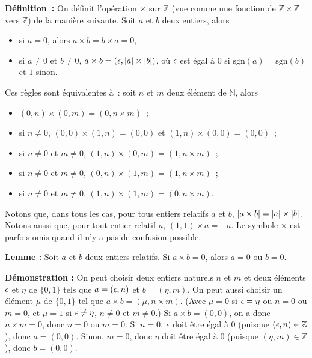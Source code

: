 \noindent\textbf{Définition :} 
    On définit l'opération $\times$ sur $\mathbb{Z}$ (vue comme une fonction de $\mathbb{Z} \times \mathbb{Z}$ vers $\mathbb{Z}$) de la manière suivante.
    Soit $a$ et $b$ deux entiers, alors
    \begin{itemize}[nosep]
        \item si $a = 0$, alors $a \times b = b \times a = 0$,
        \item si $a \neq 0$ et $b \neq 0$, $a \times b = (\epsilon, \left\lvert a \right\rvert \times \left\lvert b \right\rvert)$, où $\epsilon$ est égal à $0$ si $\mathrm{sgn}(a) = \mathrm{sgn}(b)$ et $1$ sinon.
    \end{itemize}
    Ces règles sont équivalentes à : soit $n$ et $m$ deux élément de $\mathbb{N}$, alors 
    \begin{itemize}[nosep]
        \item $(0,n) \times (0,m) = (0, n \times m)$ ;
        \item si $n \neq 0$, $(0,0) \times (1,n) = (0, 0)$ et $(1, n) \times (0, 0) = (0,0)$ ;
        \item si $n \neq 0$ et $m \neq 0$, $(1,n) \times (0,m) = (1, n \times m)$ ;
        \item si $n \neq 0$ et $m \neq 0$, $(0,n) \times (1,m) = (1, n \times m)$ ;
        \item si $n \neq 0$ et $m \neq 0$, $(1,n) \times (1,m) = (0, n \times m)$. 
    \end{itemize}
    Notons que, dans tous les cas, pour tous entiers relatifs $a$ et $b$, $\left\lvert a \times b \right\rvert = \left\lvert a \right\rvert \times \left\lvert b \right\rvert$.
    Notons aussi que, pour tout entier relatif $a$, $(1,1) \times a = -a$.
    Le symbole $\times$ est parfois omis quand il n'y a pas de confusion possible.
    \sindex[isy]{$\times$}

\medskip

\noindent\textbf{Lemme :} Soit $a$ et $b$ deux entiers relatifs.
    Si $a \times b = 0$, alors $a = 0$ ou $b = 0$.

\medskip

\noindent\textbf{Démonstration :}  
    On peut choisir deux entiers naturels $n$ et $m$ et deux éléments $\epsilon$ et $\eta$ de $\lbrace 0, 1 \rbrace$ tels que $a = (\epsilon, n)$ et $b = (\eta, m)$. 
    On peut aussi choisir un élément $\mu$ de $\lbrace 0, 1 \rbrace$ tel que $a \times b = (\mu, n \times m)$.
    (Avec $\mu = 0$ si $\epsilon = \eta$ ou $n = 0$ ou $m = 0$, et $\mu = 1$ si $\epsilon \neq \eta$, $n \neq 0$ et $m \neq 0$.)
    Si $a \times b = (0,0)$, on a donc $n \times m = 0$, donc $n = 0$ ou $m = 0$.
    Si $n = 0$, $\epsilon$ doit être égal à $0$ (puisque $(\epsilon,n) \in \mathbb{Z}$), donc $a = (0,0)$.
    Sinon, $m = 0$, donc $\eta$ doit être égal à $0$ (puisque $(\eta,m) \in \mathbb{Z}$), donc $b = (0,0)$.

